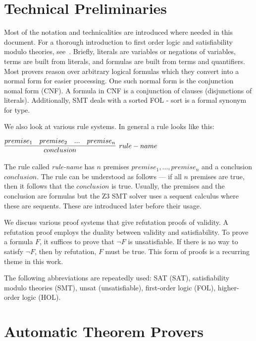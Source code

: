 \documentclass{article}
\begin{document}
\section{Technical Preliminaries}
\label{sec:prelim}
	Most of the notation and technicalities are 
	introduced where needed in this document. For a 
	thorough introduction to first order logic and 
	satisfiability modulo theories, 
	see~\cite{DBLP:reference/mc/BarrettT18}.
	Briefly, literals are variables or negations of 
	variables, terms are built from literals, and 
	formulas are built from terms and quantifiers. 
	Most provers reason over arbitrary logical 
	formulas which they convert into a normal form 
	for easier processing. One such normal form is 
	the conjunction nomal form (CNF). A formula in 
	CNF is a conjunction of clauses (disjunctions 
	of literals). Additionally, SMT deals with a 
	sorted FOL - sort is a formal synonym for type. 
	
	We also look at various rule systems. In 
	general a rule looks like this:
	\begin{center}
		$\infer[rule-name]{conclusion}
			{premise_1 & premise_2 & ... & premise_n}$
	\end{center}
	The rule called \textit{rule-name} has $n$ 
	premises $premise_1, ... , premise_n$ and a 
	conclusion $conclusion$. The rule can be 
	understood as follows --- if all $n$ premises 
	are true, then it follows that the $conclusion$
	is true. Usually, the premises and the conclusion 
	are formulas but the Z3 SMT solver uses a 
	sequent calculus where these are sequents. 
	These are introduced later before their usage.
	
	We discuss various proof systems that give 
	refutation proofs of validity. A refutation 
	proof employs the duality between validity 
	and satisfiability. To prove a formula 
	$F$, it suffices to prove that $\neg F$ is 
	unsatisfiable. If there is no way to satisfy 
	$\neg F$, then by refutation, $F$ must be true.
	This form of proofs is a recurring theme in 
	this work.
	
	The following abbreviations are repeatedly used:
	SAT (SAT), satisfiability modulo theories (SMT),
	unsat (unsatisfiable), first-order logic (FOL), 
	higher-order logic (HOL).
	
	
\section{Automatic Theorem Provers}
\label{sec:atp}	
\end{document}
